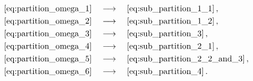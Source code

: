 \documentclass[a4paper,fleqn]{cas-sc}
\begin{document}
\begin{subequations}\label{eq:partition_mapping}
    \begin{align}
        \eqref{eq:partition_omega_1}& \quad\longrightarrow\quad \eqref{eq:sub_partition_1_1}\,,\label{eq:partition_mapping_1}\\
        \eqref{eq:partition_omega_2}& \quad\longrightarrow\quad \eqref{eq:sub_partition_1_2}\,,\label{eq:partition_mapping_2}\\
        \eqref{eq:partition_omega_3}& \quad\longrightarrow\quad \eqref{eq:sub_partition_3}\,,\label{eq:partition_mapping_3}\\
        \eqref{eq:partition_omega_4}& \quad\longrightarrow\quad \eqref{eq:sub_partition_2_1}\,,\label{eq:partition_mapping_4}\\
        \eqref{eq:partition_omega_5}& \quad\longrightarrow\quad \eqref{eq:sub_partition_2_2_and_3}\,,\label{eq:partition_mapping_5}\\
        \eqref{eq:partition_omega_6}& \quad\longrightarrow\quad \eqref{eq:sub_partition_4}\,.\label{eq:partition_mapping_6}
    \end{align}
\end{subequations}
%
\end{document}
